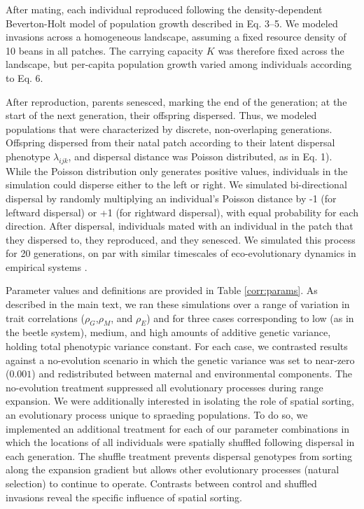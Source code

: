 \documentclass[11pt]{article}
\begin{document}
After mating, each individual reproduced following the density-dependent Beverton-Holt model of population growth described in Eq. 3--5.
We modeled invasions across a homogeneous landscape, assuming a fixed resource density of 10 beans in all patches. The carrying capacity $K$ was therefore fixed across the landscape, but per-capita population growth varied among individuals according to Eq. 6.

After reproduction, parents senesced, marking the end of the generation; at the start of the next generation, their offspring dispersed.
Thus, we modeled populations that were characterized by discrete, non-overlaping generations.
Offspring dispersed from their natal patch according to their latent dispersal phenotype $\lambda_{ijk}$, and dispersal distance was Poisson distributed, as in Eq. 1).
While the Poisson distribution only generates positive values, individuals in the simulation could disperse either to the left or right. We simulated bi-directional dispersal by randomly multiplying an individual's Poisson distance by -1 (for leftward dispersal) or +1 (for rightward dispersal), with equal probability for each direction.
After dispersal, individuals mated with an individual in the patch that they dispersed to, they reproduced, and they senesced.
We simulated this process for 20 generations, on par with similar timescales of eco-evolutionary dynamics in empirical systems \citep{williams_rapid_2016,ochocki_rapid_2017,weiss-lehman_rapid_2017}.

Parameter values and definitions are provided in Table \ref{corr:params}. 
As described in the main text, we ran these simulations over a range of variation in trait correlations ($\rho_{G}$,$\rho_{M}$, and $\rho_{E}$) and for three cases corresponding to low (as in the beetle system), medium, and high amounts of additive genetic variance, holding total phenotypic variance constant. 
For each case, we contrasted results against a no-evolution scenario in which the genetic variance was set to near-zero ($0.001$) and redistributed between maternal and environmental components.
The no-evolution treatment suppressed all evolutionary processes during range expansion.
We were additionally interested in isolating the role of spatial sorting, an evolutionary process unique to spraeding populations. 
To do so, we implemented an additional treatment for each of our parameter combinations in which the locations of all individuals were spatially shuffled following dispersal in each generation. 
The shuffle treatment prevents dispersal genotypes from sorting along the expansion gradient but allows other evolutionary processes (natural selection) to continue to operate. 
Contrasts between control and shuffled invasions reveal the specific influence of spatial sorting.
\end{document}
